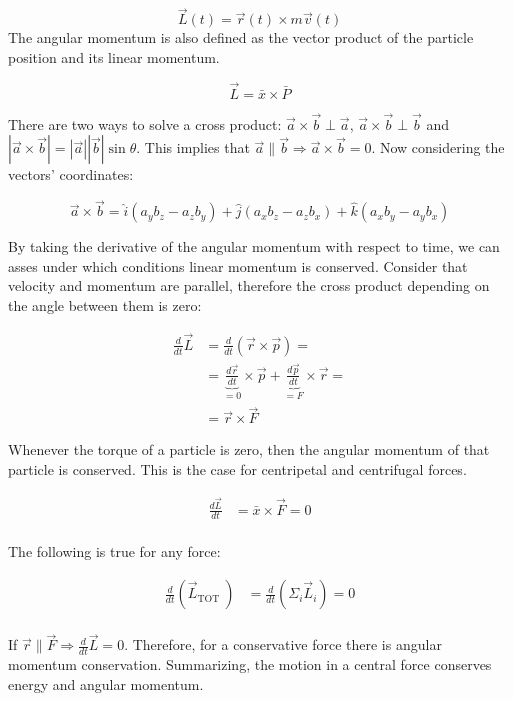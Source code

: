   $$\vec{L}(t) = \vec{r}(t)\times m \vec{v}(t)$$
  The angular momentum is also defined as the vector product of the particle position and its linear momentum.

  $$\vec{L}=\bar{x} \times \bar{P}$$

  There are two ways to solve a cross product: $\vec{a}\times \vec{b}\perp \vec{a}$, $\vec{a}\times \vec{b}\perp \vec{b}$ and $|\vec{a}\times \vec{b}| = |\vec{a}||\vec{b}|\sin\theta$.
  This implies that $\vec{a}\parallel \vec{b}\Rightarrow \vec{a}\times \vec{b} = 0$.
  Now considering the vectors' coordinates:

  $$\vec{a}\times \vec{b} = \hat{i}(a_yb_z - a_zb_y) + \hat{j}(a_xb_z - a_zb_x) + \hat{k}(a_xb_y-a_yb_x)$$

  By taking the derivative of the angular momentum with respect to time, we can asses under which conditions linear momentum is conserved.
  Consider that velocity and momentum are parallel, therefore the cross product depending on the angle between them is zero:

\begin{align*}
    \frac{d{}}{d{t}}\vec{L} &= \frac{d{}}{d{t}}(\vec{r}\times \vec{p})=\\
                            &=\underbrace{\frac{d{\vec{r}}}{d{t}}}_{=0}\times\vec{p} + \underbrace{\frac{d{\vec{p}}}{d{t}}}_{=F}\times\vec{r} =\\
                            &= \vec{r}\times \vec{F}
  \end{align*}

  Whenever the torque of a particle is zero, then the angular momentum of that particle is conserved.
  This is the case for centripetal and centrifugal forces.

  \begin{align*}
    \frac{d \vec{L}}{d t}&=\bar{x} \times \vec{F}=0 \\
   \end{align*}

  The following is true for any force:

   \begin{align*}
    \frac{d}{d t}\left(\vec{L}_{\text {TOT }}\right)&=\frac{d}{d t}\left(\Sigma_{i} \vec{L}_{i}\right)=0 \\
  \end{align*}

  If $\vec{r}\parallel \vec{F}\Rightarrow \frac{d{}}{d{t}}\vec{L} = 0$.
  Therefore, for a conservative force there is angular momentum conservation.
  Summarizing, the motion in a central force conserves energy and angular momentum.

